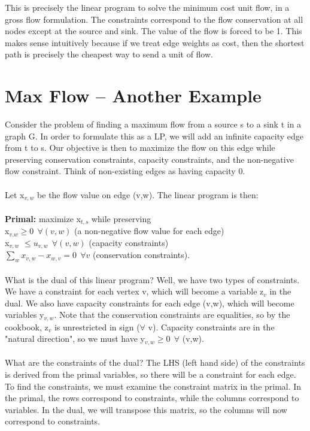 \documentclass[11pt]{article}
\begin{document}
This is precisely the linear program to solve the minimum cost unit flow, in a gross flow formulation. The constraints correspond to the flow conservation at all nodes except at the source and sink. The value of the flow is forced to be 1. This makes sense intuitively because if we treat edge weights as cost, then the shortest path is precisely the cheapest way to send a unit of flow.

\section{Max Flow -- Another Example}

Consider the problem of finding a maximum flow from a source s to a sink t in a graph G. In order to formulate this as a LP, we will add an infinite capacity edge from t to s. Our objective is then to maximize the flow on this edge while preserving conservation constraints, capacity constraints, and the non-negative flow constraint. Think of non-existing edges as having capacity 0.
\\
\\
Let x$_{v,w}$ be the flow value on edge (v,w). The linear program is then:
\\
\\
{\bf Primal:} maximize x$_{t,s}$ while preserving\\
x$_{v.w} \geq 0 \ \ \forall (v,w)$ (a non-negative flow value for each edge)\\
x$_{v,w}$ $\leq u_{v,w} \ \ \forall (v,w)$ (capacity constraints)\\
$\sum_{w} x_{v,w} - x_{w,v} = 0 \ \ \forall v$ (conservation constraints).
\\
\\
What is the dual of this linear program? Well, we have two types of constraints. We have a constraint for each vertex v, which will become a variable z$_{v}$ in the dual. We also have capacity constraints for each edge (v,w), which will become variables y$_{v,w}$. Note that the conservation constraints are equalities, so by the cookbook, z$_{v}$ is unrestricted in sign ($\forall$ v). Capacity constraints are in the "natural direction", so we must have y$_{v,w} \geq 0 \ \ \forall$ (v,w). 
\\
\\
What are the constraints of the dual? The LHS (left hand side) of the constraints is derived from the primal variables, so there will be a constraint for each edge. To find the constraints, we must examine the constraint matrix in the primal. In the primal, the rows correspond to constraints, while the columns correspond to variables. In the dual, we will transpose this matrix, so the columns will now correspond to constraints.
\end{document}
